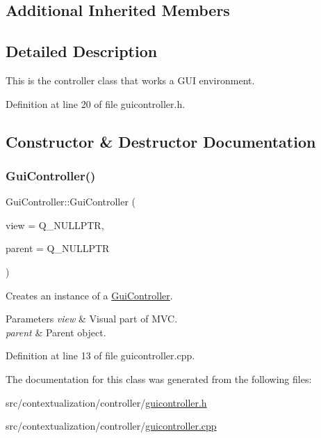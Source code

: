 \subsection*{Additional Inherited Members}


\subsection{Detailed Description}
This is the controller class that works a G\+UI environment. 

Definition at line 20 of file guicontroller.\+h.



\subsection{Constructor \& Destructor Documentation}
\mbox{\label{classGuiController_a853ee45214496ae1e59cd0139ecd1552}} 
\subsubsection{\texorpdfstring{Gui\+Controller()}{GuiController()}}
{\footnotesize\ttfamily Gui\+Controller\+::\+Gui\+Controller (\begin{DoxyParamCaption}\item[{Q\+Quick\+Window $\ast$}]{view = {\ttfamily Q\+\_\+NULLPTR},  }\item[{Q\+Object $\ast$}]{parent = {\ttfamily Q\+\_\+NULLPTR} }\end{DoxyParamCaption})}



Creates an instance of a \mbox{\hyperlink{classGuiController}{Gui\+Controller}}. 


\begin{DoxyParams}{Parameters}
{\em view} & Visual part of M\+VC. \\
\hline
{\em parent} & Parent object. \\
\hline
\end{DoxyParams}


Definition at line 13 of file guicontroller.\+cpp.



The documentation for this class was generated from the following files\+:\begin{DoxyCompactItemize}
\item 
src/contextualization/controller/\mbox{\hyperlink{guicontroller_8h}{guicontroller.\+h}}\item 
src/contextualization/controller/\mbox{\hyperlink{guicontroller_8cpp}{guicontroller.\+cpp}}\end{DoxyCompactItemize}
